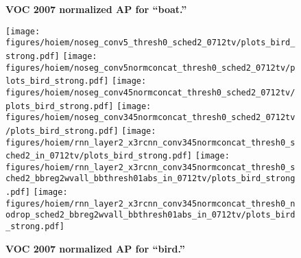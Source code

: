\documentclass[10pt,twocolumn,letterpaper]{article}
\begin{document}
\begin{figure}[t]
\begin{center}
  \end{center}
  \vspace{-12pt}
  \caption{%
    \textbf{VOC 2007 normalized AP for ``boat.''}
  }
  \label{fig:hoiem}
\end{figure}\begin{figure}[t]
  \begin{center}
   \texttt{[image: figures/hoiem/noseg\_conv5\_thresh0\_sched2\_0712tv/plots\_bird\_strong.pdf]}
   \texttt{[image: figures/hoiem/noseg\_conv5normconcat\_thresh0\_sched2\_0712tv/plots\_bird\_strong.pdf]}
   \texttt{[image: figures/hoiem/noseg\_conv45normconcat\_thresh0\_sched2\_0712tv/plots\_bird\_strong.pdf]}
   \texttt{[image: figures/hoiem/noseg\_conv345normconcat\_thresh0\_sched2\_0712tv/plots\_bird\_strong.pdf]}
   \texttt{[image: figures/hoiem/rnn\_layer2\_x3rcnn\_conv345normconcat\_thresh0\_sched2\_in\_0712tv/plots\_bird\_strong.pdf]}
   \texttt{[image: figures/hoiem/rnn\_layer2\_x3rcnn\_conv345normconcat\_thresh0\_sched2\_bbreg2wvall\_bbthresh01abs\_in\_0712tv/plots\_bird\_strong.pdf]}
   \texttt{[image: figures/hoiem/rnn\_layer2\_x3rcnn\_conv345normconcat\_thresh0\_nodrop\_sched2\_bbreg2wvall\_bbthresh01abs\_in\_0712tv/plots\_bird\_strong.pdf]}
  \end{center}
  \vspace{-12pt}
  \caption{%
    \textbf{VOC 2007 normalized AP for ``bird.''}
  }
  \label{fig:hoiem}
\end{figure}
\end{document}
